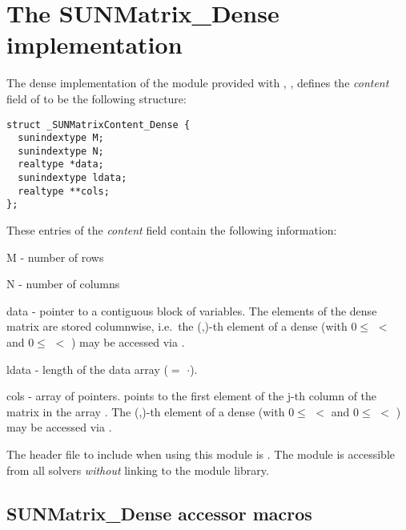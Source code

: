 \section{The SUNMatrix\_Dense implementation}\label{ss:sunmat_dense}

The dense implementation of the {\sunmatrix} module provided with
{\sundials}, {\sunmatdense}, defines the {\em content} field
of  to be the following structure:
\begin{verbatim} 
struct _SUNMatrixContent_Dense {
  sunindextype M;
  sunindextype N;
  realtype *data;
  sunindextype ldata;
  realtype **cols;
};
\end{verbatim}
These entries of the \emph{content} field contain the following
information:
\begin{args}[ldata]
  \item[M] - number of rows
  \item[N] - number of columns
  \item[data] - pointer to a contiguous block of  variables.
    The elements of the dense matrix are stored columnwise, i.e.~the
    (,)-th element of a dense {\sunmatrix}  
    (with $0 \le$  $<$  and $ 0 \le$  $<$ ) 
    may be accessed via .
  \item[ldata] - length of the data array ($=$ $\cdot$).
  \item[cols] - array of pointers.  points to the first
    element of the j-th column of the matrix in the array .
    The (,)-th element of a dense {\sunmatrix} 
    (with $0 \le$  $<$  and $ 0 \le$  $<$ ) 
    may be accessed via .
\end{args}

\noindent The header file to include when using this module 
is . The {\sunmatdense} module
is accessible from all {\sundials} solvers \textit{without}
linking to the \newline
{} module library.


\subsection{SUNMatrix\_Dense accessor macros}
\label{ss:sunmat_dense_macros}


